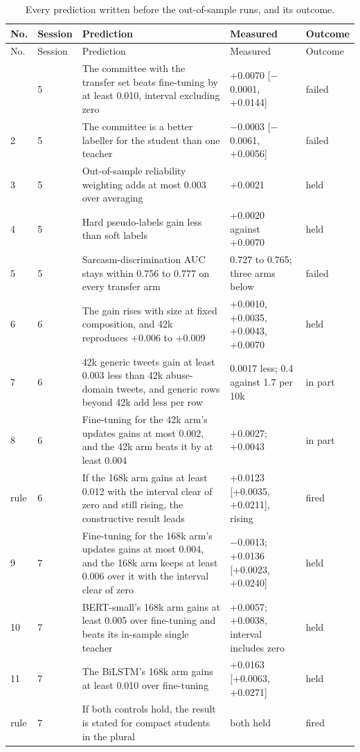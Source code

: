 {\footnotesize
\setlength{\tabcolsep}{4pt}
\begin{longtable}{p{0.8cm}p{0.9cm}p{7.0cm}p{3.6cm}p{1.2cm}}
\caption{Every prediction written before the out-of-sample runs, and its outcome.}
\label{tab:predictions}\\
\toprule
No. & Session & Prediction & Measured & Outcome \\
\midrule
\endfirsthead
\toprule
No. & Session & Prediction & Measured & Outcome \\
\midrule
\endhead
\bottomrule
\endfoot
1 & 5 & The committee with the transfer set beats fine-tuning by at least 0.010, interval excluding zero & +0.0070 [$-$0.0001, +0.0144] & failed \\
2 & 5 & The committee is a better labeller for the student than one teacher & $-$0.0003 [$-$0.0061, +0.0056] & failed \\
3 & 5 & Out-of-sample reliability weighting adds at most 0.003 over averaging & +0.0021 & held \\
4 & 5 & Hard pseudo-labels gain less than soft labels & +0.0020 against +0.0070 & held \\
5 & 5 & Sarcasm-discrimination AUC stays within 0.756 to 0.777 on every transfer arm & 0.727 to 0.765; three arms below & failed \\
6 & 6 & The gain rises with size at fixed composition, and 42k reproduces +0.006 to +0.009 & +0.0010, +0.0035, +0.0043, +0.0070 & held \\
7 & 6 & 42k generic tweets gain at least 0.003 less than 42k abuse-domain tweets, and generic rows beyond 42k add less per row & 0.0017 less; 0.4 against 1.7 per 10k & in part \\
8 & 6 & Fine-tuning for the 42k arm's updates gains at most 0.002, and the 42k arm beats it by at least 0.004 & +0.0027; +0.0043 & in part \\
rule & 6 & If the 168k arm gains at least 0.012 with the interval clear of zero and still rising, the constructive result leads & +0.0123 [+0.0035, +0.0211], rising & fired \\
9 & 7 & Fine-tuning for the 168k arm's updates gains at most 0.004, and the 168k arm keeps at least 0.006 over it with the interval clear of zero & $-$0.0013; +0.0136 [+0.0023, +0.0240] & held \\
10 & 7 & BERT-small's 168k arm gains at least 0.005 over fine-tuning and beats its in-sample single teacher & +0.0057; +0.0038, interval includes zero & held \\
11 & 7 & The BiLSTM's 168k arm gains at least 0.010 over fine-tuning & +0.0163 [+0.0063, +0.0271] & held \\
rule & 7 & If both controls hold, the result is stated for compact students in the plural & both held & fired \\
\end{longtable}
}
